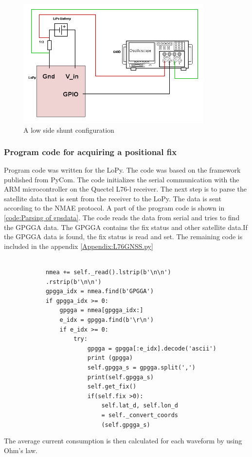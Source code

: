 \begin{figure}[H]
\centering
\includegraphics[height=6.5cm]{Project_Report/Images/LoPy_Schematic.png}
\caption{A low side shunt configuration}
\label{fig:LoPy_Schematic}
\end{figure}


\subsubsection{Program code for acquiring a positional fix}
Program code was written for the LoPy. The code was based on the framework published from PyCom. The code initializes the serial communication with the ARM microcontroller on the Quectel L76-l receiver. The next step is to parse the satellite data that is sent from the receiver to the LoPy. The data is sent according to the NMAE protocol. A part of the program code is shown in \ref{code:Parsing of gpsdata}. The code reads the data from serial and tries to find the GPGGA data. The GPGGA contains the fix status and other satellite data.If the GPGGA data is found, the fix status is read and set. The remaining code is included in the appendix \ref{Appendix:L76GNSS.py}

\lstset{language=Python}          %

\begin{lstlisting}[frame=single]  % Start your code-block

            nmea += self._read().lstrip(b'\n\n')
            .rstrip(b'\n\n')
            gpgga_idx = nmea.find(b'GPGGA')
            if gpgga_idx >= 0:
                gpgga = nmea[gpgga_idx:]
                e_idx = gpgga.find(b'\r\n')
                if e_idx >= 0:
                    try:
                        gpgga = gpgga[:e_idx].decode('ascii')
                        print (gpgga)
                        self.gpgga_s = gpgga.split(',')
                        print(self.gpgga_s)
                        self.get_fix()
                        if(self.fix >0):
                            self.lat_d, self.lon_d
                            = self._convert_coords
                            (self.gpgga_s)
\end{lstlisting}
\label{code:Parsing of gpsdata}













The average current consumption is then calculated for each waveform by using Ohm's law.
\newpage